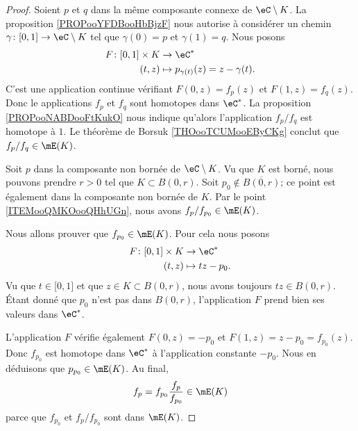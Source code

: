 \begin{proof}
    Soient \( p\) et \( q\) dans la même composante connexe de \( \eC\setminus K\). La proposition \ref{PROPooYFDBooHbBjzF} nous autorise à considérer un chemin \( \gamma\colon \mathopen[ 0 , 1 \mathclose]\to \eC\setminus K\) tel que \( \gamma(0)=p\) et \( \gamma(1)=q\). Nous posons
    \begin{equation}
        \begin{aligned}
            F\colon \mathopen[ 0 , 1 \mathclose]\times K&\to \eC^* \\
            (t,z)&\mapsto p_{\gamma(t)}(z)=z-\gamma(t). 
        \end{aligned}
    \end{equation}
    C'est une application continue vérifiant \( F(0,z)=f_p(z)\) et \( F(1,z)=f_q(z)\). Donc le applications \( f_p\) et \( f_q\) sont homotopes dans \( \eC^*\). La proposition \ref{PROPooNABDooFtKukO} nous indique qu'alors l'application \( f_p/f_q\) est homotope à \( 1\). Le théorème de Borsuk \ref{THOooTCUMooEByCKg} conclut que \( f_p/f_q\in\mE(K)\).

    Soit \( p\) dans la composante non bornée de \( \eC\setminus K\). Vu que \( K\) est borné, nous pouvons prendre \( r>0\) tel que \( K\subset B(0,r)\). Soit \( p_0\notin \overline{ B(0,r) }\); ce point est également dans la composante non bornée de \( K\). Par le point \ref{ITEMooQMKOooQHhUGn}, nous avons \( f_p/f_{p_0}\in\mE(K)\).

    Nous allons prouver que \( f_{p_0}\in \mE(K)\). Pour cela nous posons
    \begin{equation}
        \begin{aligned}
            F\colon \mathopen[ 0 , 1 \mathclose]\times K&\to \eC^* \\
            (t,z)&\mapsto tz-p_0. 
        \end{aligned}
    \end{equation}
    Vu que \( t\in \mathopen[ 0 , 1 \mathclose]\) et que \( z\in K\subset B(0,r)\), nous avons toujours \( tz\in B(0,r)\). Étant donné que \( p_0\) n'est pas dans \( B(0,r)\), l'application \( F\) prend bien ses valeurs dans \( \eC^*\).

    L'application \( F\) vérifie également \( F(0,z)=-p_0\) et \( F(1,z)=z-p_0=f_{p_0}(z)\). Donc \( f_{p_0}\) est homotope dans \( \eC^*\) à l'application constante \( -p_0\). Nous en déduisons que \( p_{p_0}\in\mE(K)\). Au final,
    \begin{equation}
        f_p=f_{p_0}\frac{ f_p }{ f_{p_0} }\in \mE(K)
    \end{equation}
    parce que \( f_{p_0}\) et \( f_p/f_{p_0}\) sont dans \( \mE(K)\).
\end{proof}

